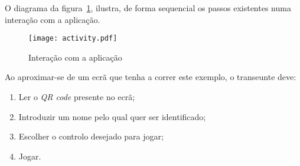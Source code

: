 	O diagrama da figura~\ref{fig:interagir}, ilustra, de forma sequencial os passos existentes numa interação com a aplicação.
	\newline

	\begin{figure}[ht]
	\centering
	\texttt{[image: activity.pdf]}
	\caption[Utilização]{Interação com a aplicação}
	\label{fig:interagir}
	\end{figure}

\pagebreak

	Ao aproximar-se de um ecrã que tenha a correr este exemplo, o transeunte deve:

	\begin{enumerate}
		\item Ler o \textit{QR code} presente no ecrã;
		\item Introduzir um nome pelo qual quer ser identificado;
		\item Escolher o controlo desejado para jogar;
		\item Jogar.
	\end{enumerate}











